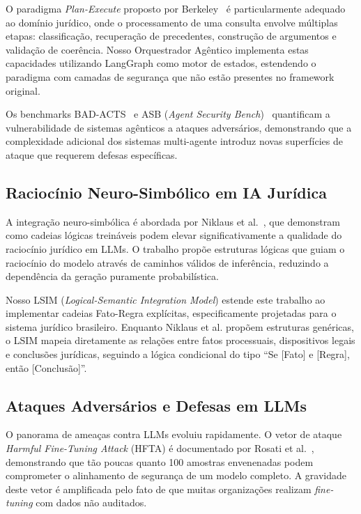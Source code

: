 \documentclass[journal,10pt]{IEEEtran}
\begin{document}
O paradigma \textit{Plan-Execute} proposto por Berkeley~\cite{berkeley2025b} \'{e} particularmente adequado ao dom\'{i}nio jur\'{i}dico, onde o processamento de uma consulta envolve m\'{u}ltiplas etapas: classifica\c{c}\~{a}o, recupera\c{c}\~{a}o de precedentes, constru\c{c}\~{a}o de argumentos e valida\c{c}\~{a}o de coer\^{e}ncia. Nosso Orquestrador Ag\^{e}ntico implementa estas capacidades utilizando LangGraph como motor de estados, estendendo o paradigma com camadas de seguran\c{c}a que n\~{a}o est\~{a}o presentes no framework original.

Os benchmarks BAD-ACTS~\cite{badacts2025a} e ASB (\textit{Agent Security Bench})~\cite{asb2025} quantificam a vulnerabilidade de sistemas ag\^{e}nticos a ataques advers\'{a}rios, demonstrando que a complexidade adicional dos sistemas multi-agente introduz novas superf\'{i}cies de ataque que requerem defesas espec\'{i}ficas.

\subsection{Racioc\'{i}nio Neuro-Simb\'{o}lico em IA Jur\'{i}dica}

A integra\c{c}\~{a}o neuro-simb\'{o}lica \'{e} abordada por Niklaus et al.~\cite{niklaus2025a}, que demonstram como cadeias l\'{o}gicas trein\'{a}veis podem elevar significativamente a qualidade do racioc\'{i}nio jur\'{i}dico em LLMs. O trabalho prop\~{o}e estruturas l\'{o}gicas que guiam o racioc\'{i}nio do modelo atrav\'{e}s de caminhos v\'{a}lidos de infer\^{e}ncia, reduzindo a depend\^{e}ncia da gera\c{c}\~{a}o puramente probabil\'{i}stica.

Nosso LSIM (\textit{Logical-Semantic Integration Model}) estende este trabalho ao implementar cadeias Fato-Regra expl\'{i}citas, especificamente projetadas para o sistema jur\'{i}dico brasileiro. Enquanto Niklaus et al. prop\~{o}em estruturas gen\'{e}ricas, o LSIM mapeia diretamente as rela\c{c}\~{o}es entre fatos processuais, dispositivos legais e conclus\~{o}es jur\'{i}dicas, seguindo a l\'{o}gica condicional do tipo ``Se [Fato] e [Regra], ent\~{a}o [Conclus\~{a}o]''.

\subsection{Ataques Advers\'{a}rios e Defesas em LLMs}

O panorama de amea\c{c}as contra LLMs evoluiu rapidamente. O vetor de ataque \textit{Harmful Fine-Tuning Attack} (HFTA) \'{e} documentado por Rosati et al.~\cite{rosati2024a,rosati2024b}, demonstrando que t\~{a}o poucas quanto 100 amostras envenenadas podem comprometer o alinhamento de seguran\c{c}a de um modelo completo. A gravidade deste vetor \'{e} amplificada pelo fato de que muitas organiza\c{c}\~{o}es realizam \textit{fine-tuning} com dados n\~{a}o auditados.
\end{document}
